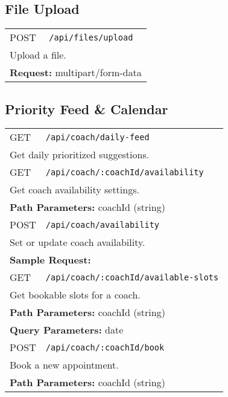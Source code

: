 \documentclass[11pt,a4paper]{article}
\begin{document}
\subsection{File Upload}
\begin{longtable}{p{2.5cm}p{10cm}}
POST & \texttt{/api/files/upload} \\
\multicolumn{2}{p{13cm}}{Upload a file.} \\
\multicolumn{2}{p{13cm}}{\textbf{Request:} multipart/form-data} \\
\end{longtable}

\subsection{Priority Feed \& Calendar}
\begin{longtable}{p{2.5cm}p{10cm}}
GET & \texttt{/api/coach/daily-feed} \\
\multicolumn{2}{p{13cm}}{Get daily prioritized suggestions.} \\
GET & \texttt{/api/coach/:coachId/availability} \\
\multicolumn{2}{p{13cm}}{Get coach availability settings.} \\
\multicolumn{2}{p{13cm}}{\textbf{Path Parameters:} coachId (string)} \\
POST & \texttt{/api/coach/availability} \\
\multicolumn{2}{p{13cm}}{Set or update coach availability.} \\
\multicolumn{2}{p{13cm}}{\textbf{Sample Request:}}
\begin{lstlisting}[language=json]
{"timeZone":"Asia/Kolkata","workingHours":[{"dayOfWeek":1,"startTime":"09:00","endTime":"17:00"}],"unavailableSlots":[],"slotDuration":30,"bufferTime":0}
\end{lstlisting} \\
GET & \texttt{/api/coach/:coachId/available-slots} \\
\multicolumn{2}{p{13cm}}{Get bookable slots for a coach.} \\
\multicolumn{2}{p{13cm}}{\textbf{Path Parameters:} coachId (string)} \\
\multicolumn{2}{p{13cm}}{\textbf{Query Parameters:} date} \\
POST & \texttt{/api/coach/:coachId/book} \\
\multicolumn{2}{p{13cm}}{Book a new appointment.} \\
\multicolumn{2}{p{13cm}}{\textbf{Path Parameters:} coachId (string)} \\

\end{longtable}
\end{document}
